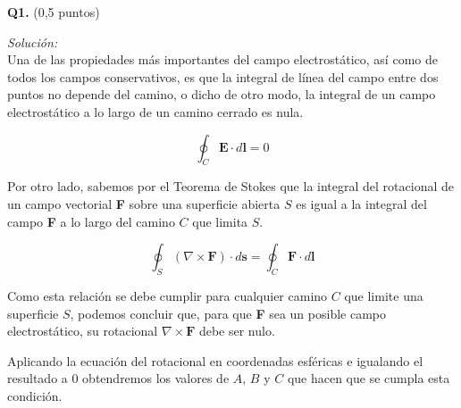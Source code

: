 \textbf{Q1.} (0,5 puntos)


\vspace{20px}
\textit{Solución:}
\\

Una de las propiedades más importantes del campo electrostático, así como de todos los campos conservativos,
es que la integral de línea del campo entre dos puntos no depende del camino, o dicho de otro modo, la
integral de un campo electrostático a lo largo de un camino cerrado es nula.

\begin{equation*}
    \oint_{C} \textbf{E} \cdot d\textbf{l} = 0
\end{equation*}

Por otro lado, sabemos por el Teorema de Stokes que la integral del rotacional de un campo vectorial \textbf{F}
sobre una superficie abierta
$S$ es igual a la integral del campo \textbf{F} a lo largo del camino $C$ que limita $S$.

\begin{equation*}
    \oint_{S} (\nabla \times \textbf{F}) \cdot d\textbf{s} = \oint_{C} \textbf{F} \cdot d\textbf{l}
\end{equation*}

Como esta relación se debe cumplir para cualquier camino $C$ que limite una superficie $S$, podemos concluir que, para que
\textbf{F} sea un posible campo electrostático, su
rotacional $\nabla \times \textbf{F}$ debe ser nulo.

Aplicando la ecuación del rotacional en coordenadas esféricas e igualando el resultado a 0 obtendremos los valores de
$A$, $B$ y $C$ que hacen que se cumpla esta condición.

\renewcommand{\arraystretch}{1.2}

